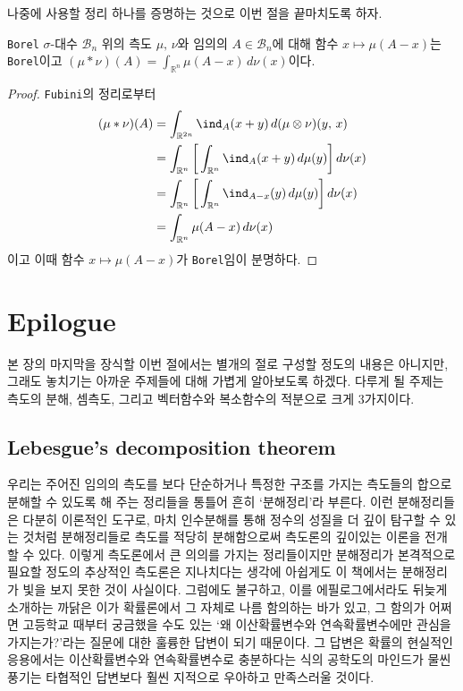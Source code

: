나중에 사용할 정리 하나를 증명하는 것으로 이번 절을 끝마치도록 하자.

\begin{theorem}
    \texttt{Borel} $\sigma$-대수 $\mathcal{B}_n$ 위의 측도 $\mu,\,\nu$와 임의의 $A\in\mathcal{B}_n$에 대해 함수 $x\mapsto\mu(A-x)$는 \texttt{Borel}이고 $(\mu*\nu)(A)=\int_{\mathbb{R}^n}\mu(A-x)\,d\nu(x)$이다.
\end{theorem}

\begin{proof}
    \texttt{Fubini}의 정리로부터
    \begin{align*}
        (\mu*\nu)(A)&=\int_{\mathbb{R}^{2n}}\ind_A(x+y)\,d(\mu\otimes\nu)(y,\,x)\\
        &=\int_{\mathbb{R}^n}\bigg[\int_{\mathbb{R}^n}\ind_A(x+y)\,d\mu(y)\bigg]\,d\nu(x)\\
        &=\int_{\mathbb{R}^n}\bigg[\int_{\mathbb{R}^n}\ind_{A-x}(y)\,d\mu(y)\bigg]\,d\nu(x)\\
        &=\int_{\mathbb{R}^n}\mu(A-x)\,d\nu(x)
    \end{align*}
    이고 이때 함수 $x\mapsto\mu(A-x)$가 \texttt{Borel}임이 분명하다.
\end{proof}

\section{Epilogue}

본 장의 마지막을 장식할 이번 절에서는 별개의 절로 구성할 정도의 내용은 아니지만, 그래도 놓치기는 아까운 주제들에 대해 가볍게 알아보도록 하겠다. 다루게 될 주제는 측도의 분해, 셈측도, 그리고 벡터함수와 복소함수의 적분으로 크게 3가지이다.

\subsection{Lebesgue's decomposition theorem}

우리는 주어진 임의의 측도를 보다 단순하거나 특정한 구조를 가지는 측도들의 합으로 분해할 수 있도록 해 주는 정리들을 통틀어 흔히 `분해정리'라 부른다. 이런 분해정리들은 다분히 이론적인 도구로, 마치 인수분해를 통해 정수의 성질을 더 깊이 탐구할 수 있는 것처럼 분해정리들로 측도를 적당히 분해함으로써 측도론의 깊이있는 이론을 전개할 수 있다. 이렇게 측도론에서 큰 의의를 가지는 정리들이지만 분해정리가 본격적으로 필요할 정도의 추상적인 측도론은 지나치다는 생각에 아쉽게도 이 책에서는 분해정리가 빛을 보지 못한 것이 사실이다. 그럼에도 불구하고, 이를 에필로그에서라도 뒤늦게 소개하는 까닭은 이가 확률론에서 그 자체로 나름 함의하는 바가 있고, 그 함의가 어쩌면 고등학교 때부터 궁금했을 수도 있는 `왜 이산확률변수와 연속확률변수에만 관심을 가지는가?'라는 질문에 대한 훌륭한 답변이 되기 때문이다. 그 답변은 확률의 현실적인 응용에서는 이산확률변수와 연속확률변수로 충분하다는 식의 공학도의 마인드가 물씬 풍기는 타협적인 답변보다 훨씬 지적으로 우아하고 만족스러울 것이다.

